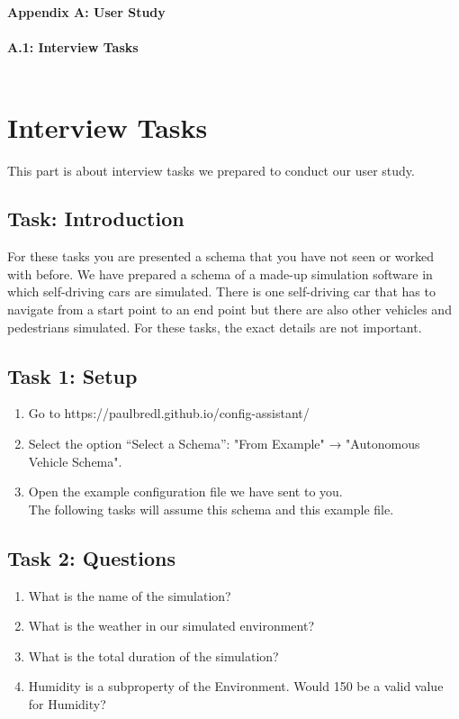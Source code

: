 {\huge \textbf{Appendix A: User Study}}\\\\
{\large \textbf{A.1: Interview Tasks }} \\\\
\section{Interview Tasks}
This part is about interview tasks we prepared to conduct our user study.
\subsection{Task: Introduction}
For these tasks you are presented a schema that you have not seen or worked with before. We have prepared a schema of a made-up simulation software in which self-driving cars are simulated. There is one self-driving car that has to navigate from a start point to an end point but there are also other vehicles and pedestrians simulated. For these tasks, the exact details are not important.

\subsection{Task 1: Setup}
\begin{enumerate}
    \item Go to https://paulbredl.github.io/config-assistant/
    \item Select the option “Select a Schema”: "From Example" → "Autonomous Vehicle Schema".
    \item Open the example configuration file we have sent to you. \\ The following tasks will assume this schema and this example file.
\end{enumerate}

\subsection{Task 2: Questions}
\begin{enumerate}
    \item What is the name of the simulation?
    \item What is the weather in our simulated environment?
    \item What is the total duration of the simulation?
    \item Humidity is a subproperty of the Environment. Would 150 be a valid value for Humidity?
\end{enumerate}

